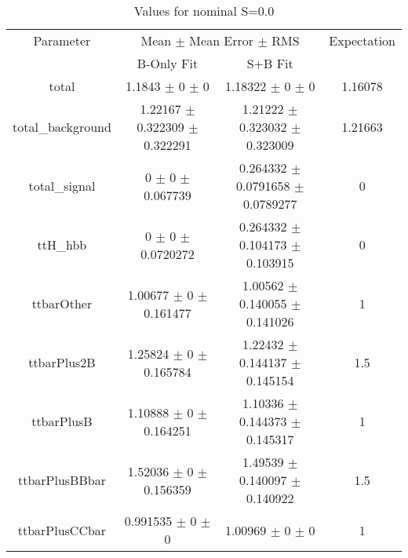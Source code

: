 \begin{table}
\centering
\caption{Values for nominal S=0.0}
\begin{tabular}{cccc}
\toprule
Parameter & \multicolumn{2}{c}{Mean $\pm$ Mean Error $\pm$ RMS} & Expectation\\
 & B-Only Fit & S+B Fit & \\
\midrule
total & \num{1.1843} $\pm$ \num{0} $\pm$ \num{0} & \num{1.18322} $\pm$ \num{0} $\pm$ \num{0} & \num{1.16078}\\
total\_background & \num{1.22167} $\pm$ \num{0.322309} $\pm$ \num{0.322291} & \num{1.21222} $\pm$ \num{0.323032} $\pm$ \num{0.323009} & \num{1.21663}\\
total\_signal & \num{0} $\pm$ \num{0} $\pm$ \num{0.067739} & \num{0.264332} $\pm$ \num{0.0791658} $\pm$ \num{0.0789277} & \num{0}\\
ttH\_hbb & \num{0} $\pm$ \num{0} $\pm$ \num{0.0720272} & \num{0.264332} $\pm$ \num{0.104173} $\pm$ \num{0.103915} & \num{0}\\
ttbarOther & \num{1.00677} $\pm$ \num{0} $\pm$ \num{0.161477} & \num{1.00562} $\pm$ \num{0.140055} $\pm$ \num{0.141026} & \num{1}\\
ttbarPlus2B & \num{1.25824} $\pm$ \num{0} $\pm$ \num{0.165784} & \num{1.22432} $\pm$ \num{0.144137} $\pm$ \num{0.145154} & \num{1.5}\\
ttbarPlusB & \num{1.10888} $\pm$ \num{0} $\pm$ \num{0.164251} & \num{1.10336} $\pm$ \num{0.144373} $\pm$ \num{0.145317} & \num{1}\\
ttbarPlusBBbar & \num{1.52036} $\pm$ \num{0} $\pm$ \num{0.156359} & \num{1.49539} $\pm$ \num{0.140097} $\pm$ \num{0.140922} & \num{1.5}\\
ttbarPlusCCbar & \num{0.991535} $\pm$ \num{0} $\pm$ \num{0} & \num{1.00969} $\pm$ \num{0} $\pm$ \num{0} & \num{1}\\
\bottomrule
\end{tabular}
\end{table}
